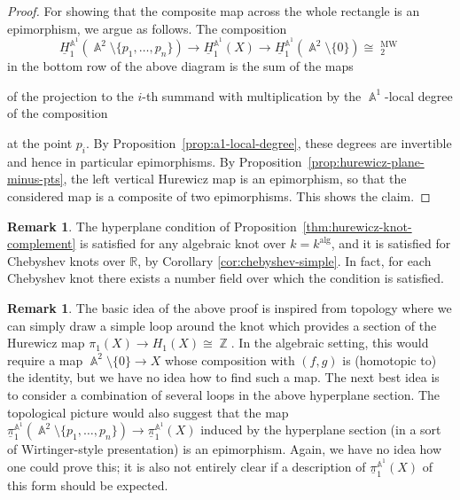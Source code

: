 \documentclass[english]{amsart}
\theoremstyle{definition}
\newtheorem{rem}[prop]{Remark}
\DeclareMathOperator{\Z}{\mathbb{Z}}
\DeclareMathOperator{\A}{\mathbb{A}}
\DeclareMathOperator{\pr}{pr}
\DeclareMathOperator{\alg}{alg}
\DeclareMathOperator{\KK}{\underline{K}}
\DeclareMathOperator{\MW}{MW}
\begin{document}
\begin{proof}
For showing that the composite map across the whole rectangle is an epimorphism, we argue as follows. The composition 
\[
\underline{H}_1^{\A^1}\!(\A^2\setminus\{p_1,\dots,p_n\})\to \underline{H}_1^{\A^1}\!(X)\to \underline{H}_1^{\A^1}\!(\A^2\setminus\{0\})\cong\KK^{\MW}_2
\]
in the bottom row of the above diagram is the sum of the maps
\begin{center}
\end{center}
of the projection to the $i$-th summand with multiplication by the $\A^1$-local degree of the composition
\begin{center}
\end{center}
at the point $p_i$. By Proposition~\ref{prop:a1-local-degree}, these degrees are invertible and hence in particular epimorphisms. By Proposition~\ref{prop:hurewicz-plane-minus-pts}, the left vertical Hurewicz map is an epimorphism, so that the considered map is a composite of two epimorphisms. This shows the claim.
\end{proof}

\begin{rem}\label{rem:assumptions for hurewicz}
The hyperplane condition of Proposition~\ref{thm:hurewicz-knot-complement} is satisfied  for any algebraic knot over $k=k^{\alg}$, and it is satisfied for Chebyshev knots over $\mathbb{R}$, by Corollary \ref{cor:chebyshev-simple}. In fact, for each Chebyshev knot there exists a number field over which the condition is satisfied.
\end{rem}
\begin{rem}
The basic idea of the above proof is inspired from topology where we can simply draw a simple loop around the knot which provides a section of the Hurewicz map $\pi_1(X)\to H_1(X)\cong\Z$. In the algebraic setting, this would require a map $\A^2\setminus\{0\}\to X$ whose composition with $(f,g)$ is (homotopic to) the identity, but we have no idea how to find such a map. The next best idea is to consider a combination of several loops in the above hyperplane section. The topological picture would also suggest that the map $\underline{\pi}_1^{\A^1}\!(\A^2\setminus\{p_1,\dots,p_n\})\to \underline{\pi}_1^{\A^1}\!(X)$ induced by the hyperplane section (in a sort of Wirtinger-style presentation) is an epimorphism. Again, we have no idea how one could prove this; it is also not entirely clear if a description of $\underline{\pi}_1^{\A^1}\!(X)$ of this form should be expected.
\end{rem}



\end{document}
